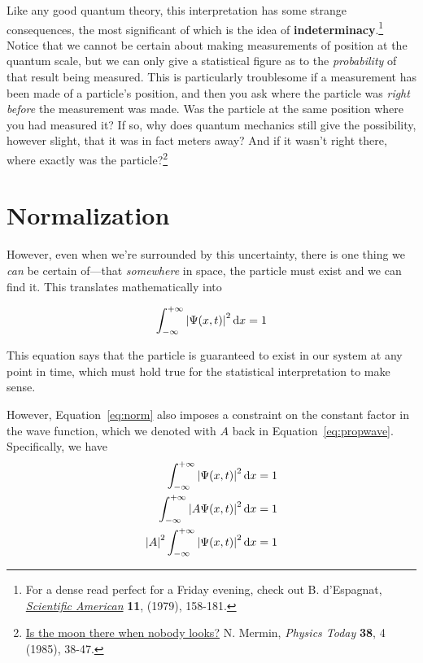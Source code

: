 Like any good quantum theory, this interpretation has some strange consequences, the most significant of which is the idea of \textbf{indeterminacy}.\footnote{For a dense read perfect for a Friday evening, check out B. d'Espagnat, \href{https://www.scientificamerican.com/media/pdf/197911_0158.pdf}{\emph{Scientific American}} \textbf{11}, (1979), 158-181.} Notice that we cannot be certain about making measurements of position at the quantum scale, but we can only give a statistical figure as to the \emph{probability} of that result being measured. This is particularly troublesome if a measurement has been made of a particle's position, and then you ask where the particle was \emph{right before} the measurement was made. Was the particle at the same position where you had measured it? If so, why does quantum mechanics still give the possibility, however slight, that it was in fact meters away? And if it wasn't right there, where exactly was the particle?\footnote{\href{http://physicstoday.scitation.org/doi/abs/10.1063/1.880968}{Is the moon there when nobody looks?} N. Mermin, \emph{Physics Today} \textbf{38}, 4 (1985), 38-47.}


\section{Normalization} \label{sec:normse}
However, even when we're surrounded by this uncertainty, there is one thing we \emph{can} be certain of---that \emph{somewhere} in space, the particle must exist and we can find it. This translates mathematically into 
\begin{tcolorbox}[title=Normalization condition] \vspace{-1ex}
	\begin{equation}
	\int_{-\infty}^{+\infty} \abs{\Psi(x,t)}^2 \dd{x} = 1 \label{eq:norm}
	\end{equation}
\end{tcolorbox}

This equation says that the particle is guaranteed to exist in our system at any point in time, which must hold true for the statistical interpretation to make sense. \par 

However, Equation~\ref{eq:norm} also imposes a constraint on the constant factor in the wave function, which we denoted with $A$ back in Equation~\ref{eq:propwave}. Specifically, we have
\begin{align*}
	\int_{-\infty}^{+\infty} \abs{\Psi(x,t)}^2 \dd{x} &= 1 \\
	\int_{-\infty}^{+\infty} \abs{A\Psi(x,t)}^2 \dd{x} &= 1 \\
	\abs{A}^2 \int_{-\infty}^{+\infty} \abs{\Psi(x,t)}^2 \dd{x} &= 1
\end{align*}

